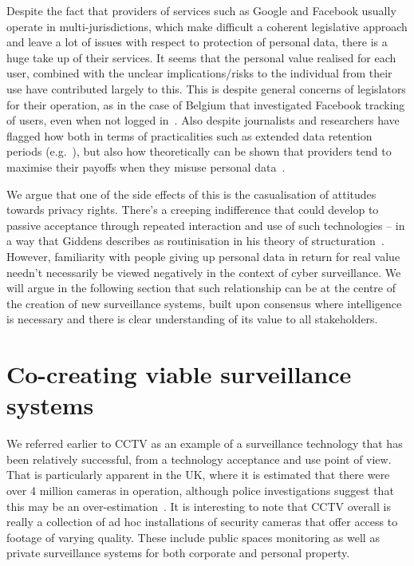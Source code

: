 \documentclass{llncs}
\begin{document}
Despite the fact that providers of services such as Google and Facebook usually operate in multi-jurisdictions, which make difficult a coherent legislative approach and leave a lot of issues with respect to protection of personal data, there is a huge take up of their services. It seems that the personal value realised for each user, combined with the unclear implications/risks to the individual from their use have contributed largely to this. This is despite general concerns of legislators for their operation, as in the case of Belgium that investigated Facebook tracking of users, even when not logged in~\cite{facebookBel}. Also despite journalists and researchers have flagged how both in terms of practicalities such as extended data retention periods (e.g.~\cite{Wired}), but also how theoretically can be shown that providers tend to maximise their payoffs when they misuse personal data~\cite{Anastasopoulou}.

We argue that one of the side effects of this is the casualisation of attitudes towards privacy rights. There's a creeping indifference that could develop to passive acceptance through repeated interaction and use of such technologies -- in a way that Giddens describes as routinisation in his theory of structuration~\cite{Giddens}. However, familiarity with people giving up personal data in return for real value needn't necessarily be viewed negatively in the context of cyber surveillance. We will argue in the following section that such relationship can be at the centre of the creation of new surveillance systems, built upon consensus where intelligence is necessary and there is clear understanding of its value to all stakeholders.

\section{Co-creating viable surveillance systems}
\label{sec:Creating}

We referred earlier to CCTV as an example of a surveillance technology that has been relatively successful, from a technology acceptance and use point of view. That is particularly apparent in the UK, where it is estimated that there were over 4 million cameras in operation, although police investigations suggest that this may be an over-estimation~\cite{HomeOffice}. It is interesting to note that CCTV overall is really a collection of ad hoc installations of security cameras that offer access to footage of varying quality. These include public spaces monitoring as well as private surveillance systems for both corporate and personal property.
\end{document}
